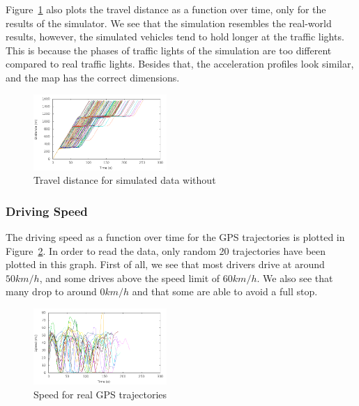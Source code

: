Figure~\ref{fig:TestResults:distance0} also plots the travel distance as a function over time, only for the results of the simulator.
We see that the simulation resembles the real-world results, however, the simulated vehicles tend to hold longer at the traffic lights. 
This is because the phases of traffic lights of the simulation are too different compared to real traffic lights. 
Besides that, the acceleration profiles look similar, and the map has the correct dimensions.%

\begin{figure}[htb]
\includegraphics[width=0.45\textwidth]{../images/tp0c0_8/distanceUncontrolled0.png}
\caption{Travel distance for simulated data without \tech}
\label{fig:TestResults:distance0}
\end{figure}

\subsubsection{Driving Speed}
The driving speed as a function over time for the GPS trajectories is plotted in Figure~\ref{fig:TestResults:RealSpeed}.
In order to read the data, only random 20 trajectories have been plotted in this graph.
First of all, we see that most drivers drive at around $50 km/h$, and some drives above the speed limit of $60 km/h$. 
We also see that many drop to around $0 km/h$ and that some are able to avoid a full stop.

\begin{figure}[htb]
\includegraphics[width=0.45\textwidth]{../images/Real/RealSpeed.png}
\caption{Speed for real GPS trajectories}
\label{fig:TestResults:RealSpeed}
\end{figure}

